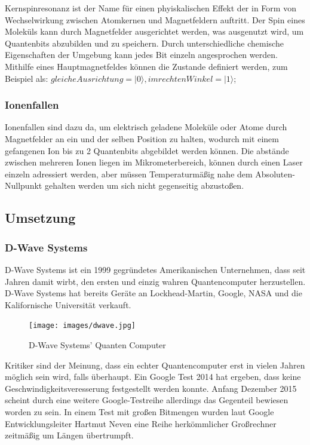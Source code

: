Kernspinresonanz ist der Name für einen phyiskalischen Effekt der in Form von Wechselwirkung zwischen Atomkernen und Magnetfeldern auftritt. Der Spin eines Moleküls kann durch Magnetfelder ausgerichtet werden, was ausgenutzt wird, um Quantenbits abzubilden und zu speichern. Durch unterschiedliche chemische Eigenschaften der Umgebung kann jedes Bit einzeln angesprochen werden. Mithilfe eines Hauptmagnetfeldes können die Zustande definiert werden, zum Beispiel als: $gleiche Ausrichtung = |0\rangle, im rechten Winkel = |1\rangle$;


\subsubsection{Ionenfallen}
\label{sec:Ionenfallen}

Ionenfallen sind dazu da, um elektrisch geladene Moleküle oder Atome durch Magnetfelder an ein und der selben Position zu halten, wodurch mit einem gefangenen Ion bis zu 2 Quantenbits abgebildet werden können. Die abstände zwischen mehreren Ionen liegen im Mikrometerbereich, können durch einen Laser einzeln adressiert werden, aber müssen Temperaturmäßig nahe dem Absoluten-Nullpunkt gehalten werden um sich nicht gegenseitig abzustoßen.


\subsection{Umsetzung}
\label{sec:Umsetzung}

\subsubsection{D-Wave Systems}
\label{sec:D-Wave Systems}

D-Wave Systems ist ein 1999 gegründetes Amerikanischen Unternehmen, dass seit Jahren damit wirbt, den ersten und einzig wahren Quantencomputer herzustellen. D-Wave Systems hat bereits Geräte an Lockhead-Martin, Google, NASA und die Kalifornische Universität verkauft.

\begin{figure}[!htb]
	\centering\texttt{[image: images/dwave.jpg]}
	\caption{D-Wave Systems' Quanten Computer}
	\label{dwave}
\end{figure}

Kritiker sind der Meinung, dass ein echter Quantencomputer erst in vielen Jahren möglich sein wird, falls überhaupt. Ein Google Test 2014 hat ergeben, dass keine Geschwindigkeitsveresserung festgestellt werden konnte. Anfang Dezember 2015 scheint durch eine weitere Google-Testreihe allerdings das Gegenteil bewiesen worden zu sein. In einem Test mit großen Bitmengen wurden laut Google Entwicklungsleiter Hartmut Neven eine Reihe herkömmlicher Großrechner zeitmäßig um Längen übertrumpft.

